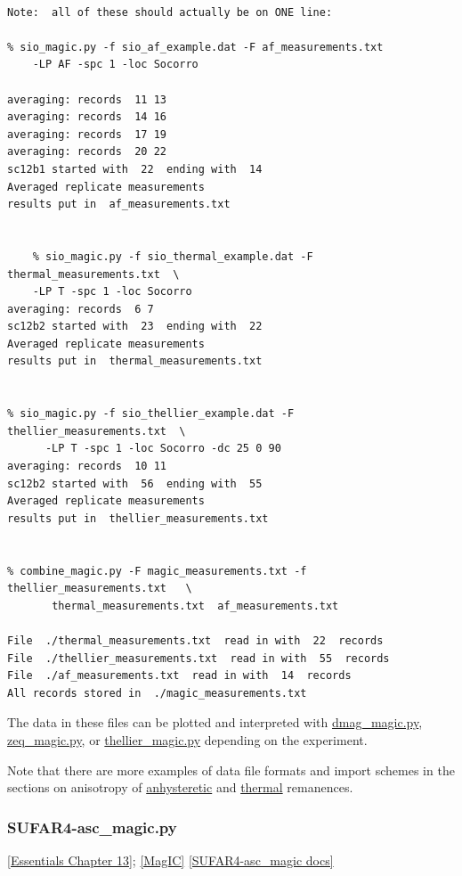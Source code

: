 \documentclass[11pt]{book}
\begin{document}
{{{\begin{verbatim}

Note:  all of these should actually be on ONE line:

% sio_magic.py -f sio_af_example.dat -F af_measurements.txt  
    -LP AF -spc 1 -loc Socorro

averaging: records  11 13
averaging: records  14 16
averaging: records  17 19
averaging: records  20 22
sc12b1 started with  22  ending with  14
Averaged replicate measurements
results put in  af_measurements.txt


    % sio_magic.py -f sio_thermal_example.dat -F thermal_measurements.txt  \
    -LP T -spc 1 -loc Socorro
averaging: records  6 7
sc12b2 started with  23  ending with  22
Averaged replicate measurements
results put in  thermal_measurements.txt


% sio_magic.py -f sio_thellier_example.dat -F  thellier_measurements.txt  \
      -LP T -spc 1 -loc Socorro -dc 25 0 90
averaging: records  10 11
sc12b2 started with  56  ending with  55
Averaged replicate measurements
results put in  thellier_measurements.txt


% combine_magic.py -F magic_measurements.txt -f  thellier_measurements.txt   \
       thermal_measurements.txt  af_measurements.txt
 
File  ./thermal_measurements.txt  read in with  22  records
File  ./thellier_measurements.txt  read in with  55  records
File  ./af_measurements.txt  read in with  14  records
All records stored in  ./magic_measurements.txt

 \end{verbatim}

The data in these files can be plotted and interpreted with \href{#dmag_magic.py}{dmag\_magic.py}, \href{#zeq_magic.py}{zeq\_magic.py}, or \href{#thellier_magic.py}{ thellier\_magic.py}  depending on the experiment.  

Note that there are more examples of data file formats and import schemes in the sections on anisotropy of \href{#aarm_magic.py}{anhysteretic}  and \href{#atrm_magic.py}{thermal} remanences.

\subsubsection{SUFAR4-asc\_magic.py}
\href{http://magician.ucsd.edu/Essentials_2/WebBook2ch13.html#ch13}{[Essentials Chapter 13]}; 
\href{#MagIC}{[MagIC]}
\href{http://earthref.org/PmagPy/pmagpydocs/SUFAR4-asc_magic-module.html}{[SUFAR4-asc\_magic docs]}


}}}
\end{document}
